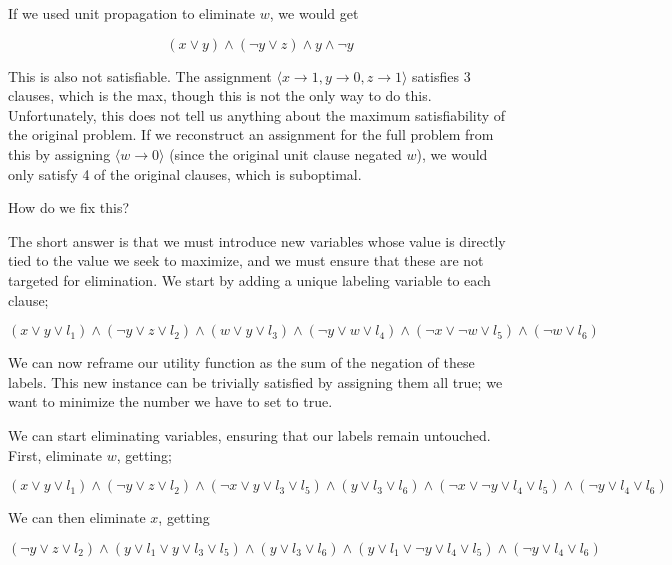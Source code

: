 If we used unit propagation to eliminate $w$, we would get

\begin{equation}
    (x \vee y) \wedge (\neg y \vee z) \wedge y \wedge \neg y
\end{equation}

This is also not satisfiable. The assignment $\langle x \rightarrow 1, y \rightarrow 0, z \rightarrow 1 \rangle$ satisfies 3 clauses, which is the max, though this is not the only way to do this. Unfortunately, this does not tell us anything about the maximum satisfiability of the original problem. If we reconstruct an assignment for the full problem from this by assigning $\langle w \rightarrow 0 \rangle$ (since the original unit clause negated $w$), we would only satisfy 4 of the original clauses, which is suboptimal.

How do we fix this?

The short answer is that we must introduce new variables whose value is directly tied to the value we seek to maximize, and we must ensure that these are not targeted for elimination. We start by adding a unique labeling variable to each clause;

\begin{equation}
    (x \vee y \vee l_1) \wedge (\neg y \vee z \vee l_2) \wedge (w \vee y \vee l_3) \wedge (\neg y \vee w \vee l_4) \wedge (\neg x \vee \neg w \vee l_5) \wedge (\neg w \vee l_6)
\end{equation}

We can now reframe our utility function as the sum of the negation of these labels. This new instance can be trivially satisfied by assigning them all true; we want to minimize the number we have to set to true.

We can start eliminating variables, ensuring that our labels remain untouched. First, eliminate $w$, getting;

\begin{equation}
    (x \vee y \vee l_1) \wedge (\neg y \vee z \vee l_2) \wedge (\neg x\lor y\lor l_3\lor l_5)\land (y\lor l_3\lor l_6)\land (\neg x\lor \neg y\lor l_4\lor l_5)\land (\neg y\lor l_4\lor l_6)
\end{equation}

We can then eliminate $x$, getting

\begin{equation}
(\neg y\lor z\lor l_2)\land (y\lor l_1\lor y\lor l_3\lor l_5)\land (y\lor l_3\lor l_6)\land (y\lor l_1\lor \neg y\lor l_4\lor l_5)\land (\neg y\lor l_4\lor l_6)
\end{equation}

